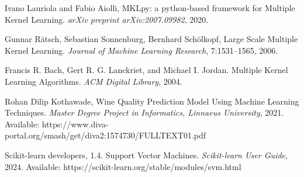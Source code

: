 \documentclass[11pt]{article}
\begin{document}
\begin{thebibliography}{1}

 Ivano Lauriola and Fabio Aiolli, MKLpy: a python-based framework for Multiple Kernel Learning. {\em arXiv preprint arXiv:2007.09982}, 2020.

 Gunnar Rätsch, Sebastian Sonnenburg, Bernhard Schölkopf, Large Scale Multiple Kernel Learning. {\em Journal of Machine Learning Research}, 7:1531–1565, 2006.

 Francis R. Bach, Gert R. G. Lanckriet, and Michael I. Jordan. Multiple Kernel Learning Algorithms. {\em ACM Digital Library}, 2004.

 Rohan Dilip Kothawade, Wine Quality Prediction Model Using Machine Learning Techniques. {\em Master Degree Project in Informatics, Linnaeus University}, 2021. Available: https://www.diva-portal.org/smash/get/diva2:1574730/FULLTEXT01.pdf

 Scikit-learn developers, 1.4. Support Vector Machines. {\em Scikit-learn User Guide}, 2024. Available: https://scikit-learn.org/stable/modules/svm.html


  \end{thebibliography}
\end{document}
